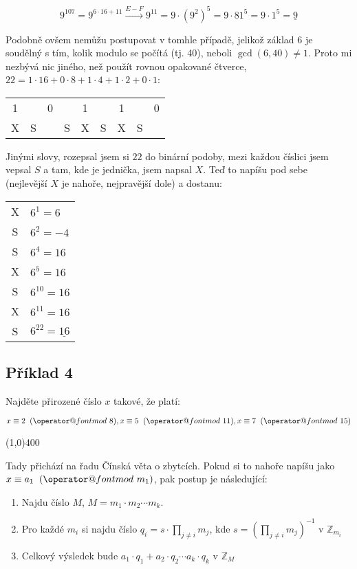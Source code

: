 \documentclass{article}
\makeatletter
\def\imod#1{\allowbreak\mkern10mu({\operator@font mod}\,\,#1)}
\makeatother
\begin{document}
$$9^{107} = 9^{6\cdot 16 + 11} \stackrel{E-F}{\rightarrow} 9^{11} = 9\cdot(9^2)^5 = 9\cdot{81^5} = 9\cdot 1^5 = \underline{9}$$

Podobně ovšem nemůžu postupovat v tomhle případě, jelikož základ 6 je soudělný s tím, kolik modulo se počítá (tj. 40), neboli $\gcd(6,40) \neq 1$. Proto mi nezbývá nic jiného, než použít rovnou opakované čtverce, $22 = 1\cdot16 + 0\cdot8 + 1\cdot4 + 1\cdot2 + 0\cdot1$:

\begin{center}  %
  \begin{tabular}{c|c|c|c|c|c|c|c|c}
		1 &   & 0 &   & 1 &   & 1 &   & 0\\ 
		X & S &   & S & X &	S & X & S &  \\
	\end{tabular}
\end{center}

Jinými slovy, rozepsal jsem si $22$ do binární podoby, mezi každou číslici jsem vepsal $S$ a tam, kde je jednička, jsem napsal $X$. Teď to napíšu pod sebe (nejlevější $X$ je nahoře, nejpravější dole) a dostanu: 
\begin{center}
	\begin{tabular}{c|l}
		X & $6^1 = 6$ \\
		S & $6^2 = -4$ \\
		S & $6^4 = 16$ \\
		X & $6^5 = 16$ \\
		S & $6^{10} = 16$ \\
		X & $6^{11} = 16$ \\
		S & $6^{22} = \underline{16}$
	\end{tabular}
\end{center}


\subsection{\label{priklad1-4}Příklad 4}
Najděte přirozené číslo $x$ takové, že platí:

$$x\equiv 2\imod{8}, x\equiv 5\imod{11}, x\equiv 7\imod{15}$$

\line(1,0){400}

Tady přichází na řadu Čínská věta o zbytcích. Pokud si to nahoře napíšu jako $x\equiv a_1\imod{m_1}$, pak postup je následující:
\begin{enumerate}
	\item Najdu číslo $M$, $M = m_1\cdot m_2 \cdots m_k$.
	\item Pro každé $m_i$ si najdu číslo $\displaystyle q_i = s\cdot \prod_{j \neq i}m_j$, kde  $s = \left( \displaystyle \prod_{j \neq i}m_j \right)^{-1}$ v $\mathbb{Z}_{m_i}$
	\item Celkový výsledek bude $a_1 \cdot q_1 + a_2 \cdot q_2 \cdots a_k \cdot q_k$ v $\mathbb{Z}_M$ 
\end{enumerate}
\end{document}
